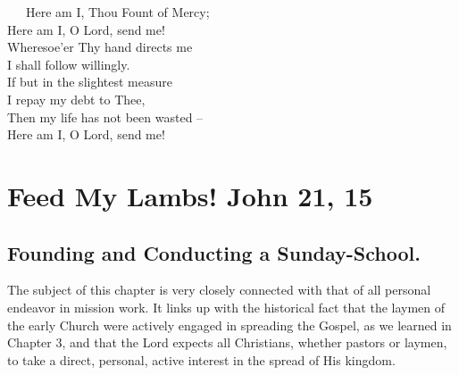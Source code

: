 \documentclass[
]{book}
\begin{document}
~~~Here am I, Thou Fount of Mercy;\\
\hspace*{0.333em}\hspace*{0.333em}\hspace*{0.333em}Here am I, O Lord, send me!\\
\hspace*{0.333em}\hspace*{0.333em}\hspace*{0.333em}Wheresoe'er Thy hand directs me\\
\hspace*{0.333em}\hspace*{0.333em}\hspace*{0.333em}I shall follow willingly.\\
\hspace*{0.333em}\hspace*{0.333em}\hspace*{0.333em}If but in the slightest measure\\
\hspace*{0.333em}\hspace*{0.333em}\hspace*{0.333em}I repay my debt to Thee,\\
\hspace*{0.333em}\hspace*{0.333em}\hspace*{0.333em}Then my life has not been wasted --\\
\hspace*{0.333em}\hspace*{0.333em}\hspace*{0.333em}Here am I, O Lord, send me!

\hypertarget{feed-my-lambs-john-21-15}{%
\chapter{Feed My Lambs! John 21, 15}\label{feed-my-lambs-john-21-15}}

\hypertarget{founding-and-conducting-a-sunday-school.}{%
\section*{Founding and Conducting a Sunday-School.}\label{founding-and-conducting-a-sunday-school.}}

The subject of this chapter is very closely connected with that of all personal endeavor in mission work. It links up with the historical fact that the laymen of the early Church were actively engaged in spreading the Gospel, as we learned in Chapter 3, and that the Lord expects all Christians, whether pastors or laymen, to take a direct, personal, active interest in the spread of His kingdom.
\end{document}
